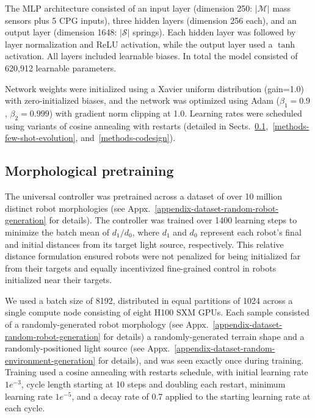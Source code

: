 The MLP architecture consisted of an input layer (dimension 250: $|\mathcal{M}|$ mass sensors plus 5 CPG inputs), three hidden layers (dimension 256 each), and an output layer (dimension 1648: $|\mathcal{S}|$ springs). Each hidden layer was followed by layer normalization and ReLU activation, while the output layer used a $\tanh$ activation. All layers included learnable biases. In total the model consisted of 620,912 learnable parameters. 

Network weights were initialized using a Xavier uniform distribution (gain=1.0) \cite{glorot2010understanding} with zero-initialized biases, and the network was optimized using Adam \cite{adamkingma} ($\beta_1=0.9$, $\beta_2=0.999$) with gradient norm clipping at 1.0. 
Learning rates were scheduled using variants of cosine annealing with restarts (detailed in Sects.~\ref{methods-pretraining},~\ref{methods-few-shot-evolution}, and~\ref{methods-codesign}).


\subsection{Morphological pretraining}
\label{methods-pretraining}

The universal controller was pretrained 
across a dataset of over 10 million distinct robot morphologies 
(see Appx.~\ref{appendix-dataset-random-robot-generation} for details). 
The controller was trained over 1400 learning steps to minimize the batch mean of $d_1/d_0$, where $d_1$ and $d_0$ represent each robot's final and initial distances from its target light source, respectively. 
This relative distance formulation ensured robots were not penalized for being initialized far from their targets and equally incentivized fine-grained control in robots initialized near their targets.

We used a batch size of 8192, distributed in equal partitions of 1024 across a single compute node consisting of eight H100 SXM GPUs. 
Each sample consisted of a randomly-generated robot morphology (see Appx.~\ref{appendix-dataset-random-robot-generation} for details) 
a randomly-generated terrain shape
and a randomly-positioned light source (see Appx.~\ref{appendix-dataset-random-environment-generation} for details), and was seen exactly once during training. 
Training used a cosine annealing with restarts schedule, with initial learning rate $1e^{-3}$, cycle length starting at 10 steps and doubling each restart, minimum learning rate $1e^{-5}$, and a decay rate of 0.7 applied to the starting learning rate at each cycle. 

